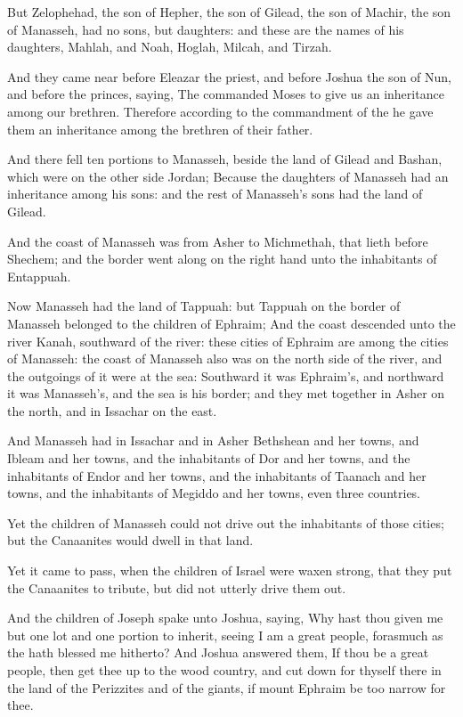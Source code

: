 \Verse But Zelophehad, the son of Hepher, the son of Gilead, the son of Machir, the son of Manasseh, had no sons, but daughters: and these are the names of his daughters, Mahlah, and Noah, Hoglah, Milcah, and Tirzah.

\Verse And they came near before Eleazar the priest, and before Joshua the son of Nun, and before the princes, saying, The \LORD commanded Moses to give us an inheritance among our brethren. Therefore according to the commandment of the \LORD he gave them an inheritance among the brethren of their father.

\Verse And there fell ten portions to Manasseh, beside the land of Gilead and Bashan, which were on the other side Jordan; \Verse Because the daughters of Manasseh had an inheritance among his sons: and the rest of Manasseh's sons had the land of Gilead.

\Verse And the coast of Manasseh was from Asher to Michmethah, that lieth before Shechem; and the border went along on the right hand unto the inhabitants of Entappuah.

\Verse Now Manasseh had the land of Tappuah: but Tappuah on the border of Manasseh belonged to the children of Ephraim; \Verse And the coast descended unto the river Kanah, southward of the river: these cities of Ephraim are among the cities of Manasseh: the coast of Manasseh also was on the north side of the river, and the outgoings of it were at the sea: \Verse Southward it was Ephraim's, and northward it was Manasseh's, and the sea is his border; and they met together in Asher on the north, and in Issachar on the east.

\Verse And Manasseh had in Issachar and in Asher Bethshean and her towns, and Ibleam and her towns, and the inhabitants of Dor and her towns, and the inhabitants of Endor and her towns, and the inhabitants of Taanach and her towns, and the inhabitants of Megiddo and her towns, even three countries.

\Verse Yet the children of Manasseh could not drive out the inhabitants of those cities; but the Canaanites would dwell in that land.

\Verse Yet it came to pass, when the children of Israel were waxen strong, that they put the Canaanites to tribute, but did not utterly drive them out.

\Verse And the children of Joseph spake unto Joshua, saying, Why hast thou given me but one lot and one portion to inherit, seeing I am a great people, forasmuch as the \LORD hath blessed me hitherto?  \Verse And Joshua answered them, If thou be a great people, then get thee up to the wood country, and cut down for thyself there in the land of the Perizzites and of the giants, if mount Ephraim be too narrow for thee.

